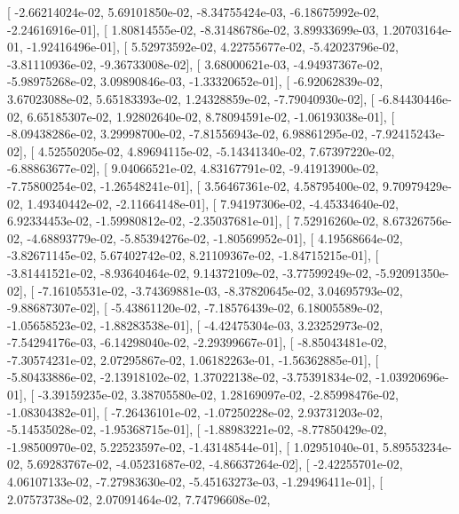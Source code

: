 \documentclass{article}
\begin{document}
       [ -2.66214024e-02,   5.69101850e-02,  -8.34755424e-03,
         -6.18675992e-02,  -2.24616916e-01],
       [  1.80814555e-02,  -8.31486786e-02,   3.89933699e-03,
          1.20703164e-01,  -1.92416496e-01],
       [  5.52973592e-02,   4.22755677e-02,  -5.42023796e-02,
         -3.81110936e-02,  -9.36733008e-02],
       [  3.68000621e-03,  -4.94937367e-02,  -5.98975268e-02,
          3.09890846e-03,  -1.33320652e-01],
       [ -6.92062839e-02,   3.67023088e-02,   5.65183393e-02,
          1.24328859e-02,  -7.79040930e-02],
       [ -6.84430446e-02,   6.65185307e-02,   1.92802640e-02,
          8.78094591e-02,  -1.06193038e-01],
       [ -8.09438286e-02,   3.29998700e-02,  -7.81556943e-02,
          6.98861295e-02,  -7.92415243e-02],
       [  4.52550205e-02,   4.89694115e-02,  -5.14341340e-02,
          7.67397220e-02,  -6.88863677e-02],
       [  9.04066521e-02,   4.83167791e-02,  -9.41913900e-02,
         -7.75800254e-02,  -1.26548241e-01],
       [  3.56467361e-02,   4.58795400e-02,   9.70979429e-02,
          1.49340442e-02,  -2.11664148e-01],
       [  7.94197306e-02,  -4.45334640e-02,   6.92334453e-02,
         -1.59980812e-02,  -2.35037681e-01],
       [  7.52916260e-02,   8.67326756e-02,  -4.68893779e-02,
         -5.85394276e-02,  -1.80569952e-01],
       [  4.19568664e-02,  -3.82671145e-02,   5.67402742e-02,
          8.21109367e-02,  -1.84715215e-01],
       [ -3.81441521e-02,  -8.93640464e-02,   9.14372109e-02,
         -3.77599249e-02,  -5.92091350e-02],
       [ -7.16105531e-02,  -3.74369881e-03,  -8.37820645e-02,
          3.04695793e-02,  -9.88687307e-02],
       [ -5.43861120e-02,  -7.18576439e-02,   6.18005589e-02,
         -1.05658523e-02,  -1.88283538e-01],
       [ -4.42475304e-03,   3.23252973e-02,  -7.54294176e-03,
         -6.14298040e-02,  -2.29399667e-01],
       [ -8.85043481e-02,  -7.30574231e-02,   2.07295867e-02,
          1.06182263e-01,  -1.56362885e-01],
       [ -5.80433886e-02,  -2.13918102e-02,   1.37022138e-02,
         -3.75391834e-02,  -1.03920696e-01],
       [ -3.39159235e-02,   3.38705580e-02,   1.28169097e-02,
         -2.85998476e-02,  -1.08304382e-01],
       [ -7.26436101e-02,  -1.07250228e-02,   2.93731203e-02,
         -5.14535028e-02,  -1.95368715e-01],
       [ -1.88983221e-02,  -8.77850429e-02,  -1.98500970e-02,
          5.22523597e-02,  -1.43148544e-01],
       [  1.02951040e-01,   5.89553234e-02,   5.69283767e-02,
         -4.05231687e-02,  -4.86637264e-02],
       [ -2.42255701e-02,   4.06107133e-02,  -7.27983630e-02,
         -5.45163273e-03,  -1.29496411e-01],
       [  2.07573738e-02,   2.07091464e-02,   7.74796608e-02,
\end{document}
